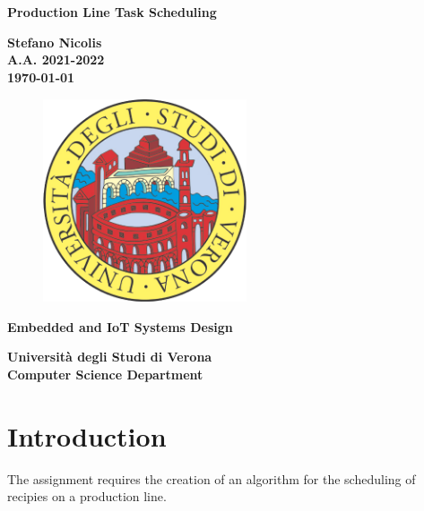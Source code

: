 \documentclass[12pt]{article}
\title{}
\author{Stefano Nicolis}
\begin{document}
\begin{titlepage}
   \begin{center}
       \vspace*{1cm}
 
	\large
      {\huge \textbf{Production Line Task Scheduling} }
 
       \vspace{1.5cm}
 
       \textbf{Stefano Nicolis}\\
	\textbf{A.A. 2021-2022}\\
	\vspace{0.35cm}
	\textbf{\today}

\vfill
\begin{figure}[h!]
	\begin{center}
	  \includegraphics[height=6cm, width=6cm]{media/logounivr}
	\end{center}
\end{figure}
 
	\vfill
 	\textbf{Embedded and IoT Systems Design\\}
 
       \vspace{3cm}
 
      \begin{multicols}{2}
      \textbf{Università degli Studi di Verona\\
	 Computer Science Department}
	\end{multicols}
 
   \end{center}
\end{titlepage}


\tableofcontents

\section{Introduction}
The assignment requires the creation of an algorithm for the scheduling of recipies on a production line.
\end{document}

